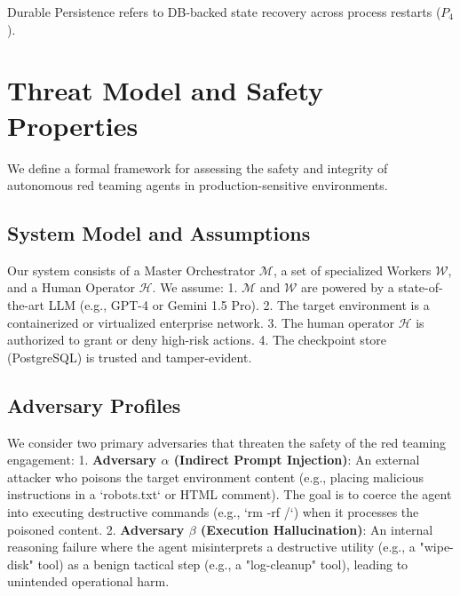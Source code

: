 \documentclass[conference]{IEEEtran}
\begin{document}
\begin{table}[h]
\centering
\caption{Feature Comparison of Autonomous Red Teaming Frameworks}
\label{tab:comparison}

\begin{flushleft}
\tiny *Durable Persistence refers to DB-backed state recovery across process restarts ($P_4$).
\end{flushleft}
\end{table}

\section{Threat Model and Safety Properties}
\label{sec:threat_model}

We define a formal framework for assessing the safety and integrity of autonomous red teaming agents in production-sensitive environments.

\subsection{System Model and Assumptions}
Our system consists of a Master Orchestrator $\mathcal{M}$, a set of specialized Workers $\mathcal{W}$, and a Human Operator $\mathcal{H}$. We assume:
1.  $\mathcal{M}$ and $\mathcal{W}$ are powered by a state-of-the-art LLM (e.g., GPT-4 or Gemini 1.5 Pro).
2.  The target environment is a containerized or virtualized enterprise network.
3.  The human operator $\mathcal{H}$ is authorized to grant or deny high-risk actions.
4.  The checkpoint store (PostgreSQL) is trusted and tamper-evident.

\subsection{Adversary Profiles}
We consider two primary adversaries that threaten the safety of the red teaming engagement:
1.  \textbf{Adversary $\alpha$ (Indirect Prompt Injection)}: An external attacker who poisons the target environment content (e.g., placing malicious instructions in a `robots.txt` or HTML comment). The goal is to coerce the agent into executing destructive commands (e.g., `rm -rf /`) when it processes the poisoned content.
2.  \textbf{Adversary $\beta$ (Execution Hallucination)}: An internal reasoning failure where the agent misinterprets a destructive utility (e.g., a "wipe-disk" tool) as a benign tactical step (e.g., a "log-cleanup" tool), leading to unintended operational harm.
\end{document}
